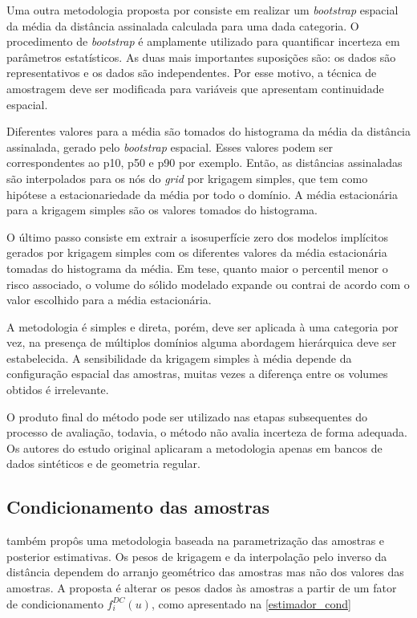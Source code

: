 Uma outra metodologia proposta por  consiste em realizar um \textit{bootstrap} espacial \cite{deutsh_spatial_bootstrap} da média da distância assinalada calculada para uma dada categoria. O procedimento de \textit{bootstrap} é amplamente utilizado para quantificar incerteza em parâmetros estatísticos. As duas mais importantes suposições são: os dados são representativos e os dados são independentes. Por esse motivo, a técnica de amostragem deve ser modificada para variáveis que apresentam continuidade espacial. 

Diferentes valores para a média são tomados do histograma da média da distância assinalada, gerado pelo \textit{bootstrap} espacial. Esses valores podem ser correspondentes ao p10, p50 e p90 por exemplo. Então, as distâncias assinaladas são interpolados para os nós do \textit{grid} por krigagem simples, que tem como hipótese a estacionariedade da média por todo o domínio. A média estacionária para a krigagem simples são os valores tomados do histograma.

O último passo consiste em extrair a isosuperfície zero dos modelos implícitos gerados por krigagem simples com os diferentes valores da média estacionária tomadas do histograma da média. Em tese, quanto maior o percentil menor o risco associado, o volume do sólido modelado expande ou contrai de acordo com o valor escolhido para a média estacionária.

A metodologia é simples e direta, porém, deve ser aplicada à uma categoria por vez, na presença de múltiplos domínios alguma abordagem hierárquica deve ser estabelecida. A sensibilidade da krigagem simples à média depende da configuração espacial das amostras, muitas vezes a diferença entre os volumes obtidos é irrelevante.

O produto final do método pode ser utilizado nas etapas subsequentes do processo de avaliação, todavia, o método não avalia incerteza de forma adequada. Os autores do estudo original aplicaram a metodologia apenas em bancos de dados sintéticos e de geometria regular. 

\subsection{Condicionamento das amostras}\label{chap:cond_amo}

 também propôs uma metodologia baseada na parametrização das amostras e posterior estimativas. Os pesos de krigagem e da interpolação pelo inverso da distância dependem do arranjo geométrico das amostras mas não dos valores das amostras. A proposta é alterar os pesos dados às amostras a partir de um fator de condicionamento $f^{DC}_i(u)$, como apresentado na \autoref{estimador_cond}

